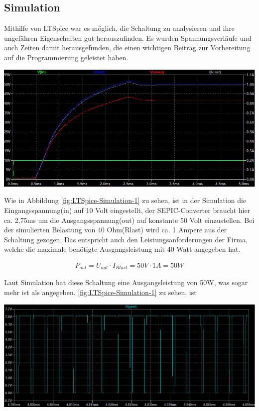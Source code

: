 \documentclass[paper=a4, 12pt]{scrreprt}
\begin{document}
		\subsection{Simulation}\hfill \break
			Mithilfe von LTSpice war es möglich, die Schaltung zu analysieren und ihre ungefähren Eigenschaften gut herauszufinden. Es wurden Spannungsverläufe und auch Zeiten damit herausgefunden, die einen wichtigen Beitrag zur Vorbereitung auf die Programmierung geleistet haben.
			\begin{adjustbox}{center,caption={Simulation der Schaltung Mittels LTSpice},label={fig:LTSpice-Simulation-1},nofloat=figure,vspace=\bigskipamount}
				\includegraphics[width=\textwidth]{img/LTSpice_Simulation_1.PNG}
			\end{adjustbox}
			Wie in Abbildung \ref{fig:LTSpice-Simulation-1} zu sehen, ist in der Simulation die Eingangsspannung(in) auf 10 Volt eingestellt, der SEPIC-Converter braucht hier ca. 2,75ms um die Ausgangsspannung(out) auf konstante 50 Volt einzustellen. Bei der simulierten Belastung von 40 Ohm(Rlast) wird ca. 1 Ampere aus der Schaltung gezogen. Das entspricht auch den Leistungsanforderungen der Firma, welche die maximale benötigte Ausgangsleistung mit 40 Watt angegeben hat.
			
			\begin{align*} 
			P_{out} = U_{out} \cdot I_{Rlast} = 50V \cdot 1A = 50W
			\end{align*} 
			
			Laut Simulation hat diese Schaltung eine Ausgangsleistung von 50W, was sogar mehr ist als angegeben. 
			\ref{fig:LTSpice-Simulation-1} zu sehen, ist
			\begin{adjustbox}{center,caption={Stabile Gate Spannung des MOSFETs},label={fig:LTSpice-Simulation-2},nofloat=figure,vspace=\bigskipamount}
				\includegraphics[width=\textwidth]{img/LTSpice_Simulation_2.PNG}
			\end{adjustbox}
			
\end{document}

